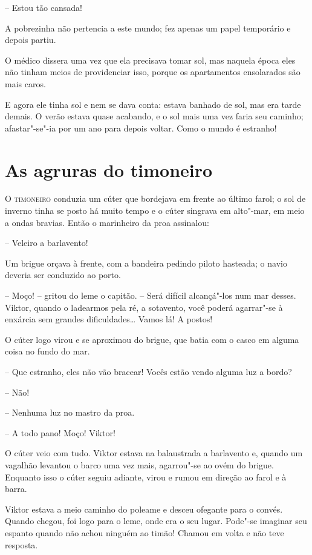 -- Estou tão cansada!

A pobrezinha não pertencia a este mundo; fez apenas um papel temporário
e depois partiu.

O médico dissera uma vez que ela precisava tomar sol, mas naquela época
eles não tinham meios de providenciar isso, porque os apartamentos
ensolarados são mais caros.

E agora ele tinha sol e nem se dava conta: estava banhado de sol, mas
era tarde demais. O verão estava quase acabando, e o sol mais uma vez  \EP[]
faria seu caminho; afastar"-se"-ia por um ano para depois voltar.
Como o mundo é estranho!

\chapter{As agruras do timoneiro}


\textsc{O timoneiro} conduzia um cúter que bordejava em frente ao último farol; o
sol de inverno tinha se posto há muito tempo e o cúter singrava em
alto"-mar, em meio a ondas bravias. Então o marinheiro da proa
assinalou: 

-- Veleiro a barlavento!

Um brigue orçava à frente, com a bandeira pedindo piloto hasteada; o navio
deveria ser conduzido ao porto.

-- Moço! -- gritou do leme o capitão. -- Será difícil alcançá"-los num mar
desses. Viktor, quando o ladearmos pela ré, a sotavento, você
poderá agarrar"-se à enxárcia sem grandes dificuldades\ldots{} Vamos lá! A
postos!

O cúter logo virou e se aproximou do brigue, que batia com o casco em
alguma coisa no fundo do mar.

-- Que estranho, eles não vão bracear! Vocês estão vendo alguma luz a bordo? 

-- Não! 

-- Nenhuma luz no mastro da proa.

-- A todo pano! Moço! Viktor!

O cúter veio com tudo. Viktor estava na balaustrada a barlavento e,
quando um vagalhão levantou o barco uma vez mais, agarrou"-se ao ovém
do brigue. Enquanto isso o cúter seguiu adiante, virou e rumou em
direção ao farol e à barra.

Viktor estava a meio caminho do poleame e desceu ofegante para o convés.
Quando chegou, foi logo para o leme, onde era o seu lugar. Pode"-se
imaginar seu espanto quando não achou ninguém ao timão! Chamou em volta
e não teve resposta.

